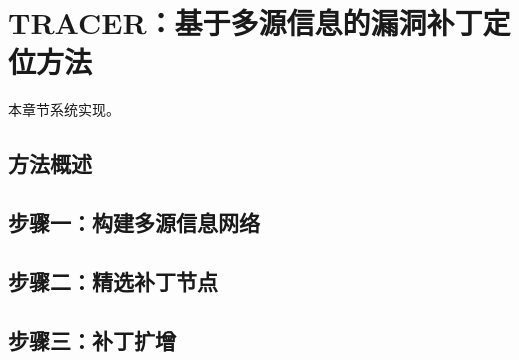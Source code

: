 \chapter{TRACER：基于多源信息的漏洞补丁定位方法}

本章节系统实现。

\section{方法概述}

\section{步骤一：构建多源信息网络}

\section{步骤二：精选补丁节点}

\section{步骤三：补丁扩增}